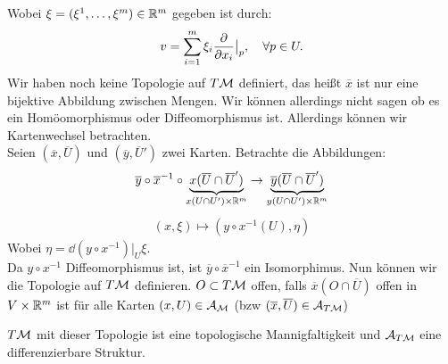 Wobei $\xi = (\xi^1, \dots, \xi^m) \in \mathbb{R}^m$ gegeben ist durch:
\begin{align}
v = \sum_{i=1}^{m} \xi_i \pdv{x_i} \big\vert_p, \quad \forall p \in U.
\end{align}
Wir haben noch keine Topologie auf $T\mathcal{M}$ definiert, das heißt $\overline{x}$ ist nur eine bijektive Abbildung zwischen Mengen.
Wir können allerdings nicht sagen ob es ein Homöomorphismus oder Diffeomorphismus ist.
Allerdings können wir Kartenwechsel betrachten.\\
Seien $(\overline{x}, \overline{U})$ und $(\overline{y}, \overline{U}')$ zwei Karten. 
Betrachte die Abbildungen:
\begin{align}
\overline{y} \circ \overline{x}^{-1} \circ \underbrace{x (\overline{U} \cap \overline{U}')}_{x(U \cap U') \times \mathbb{R}^m} \to \underbrace{\overline{y}(\overline{U} \cap \overline{U}')}_{y(U \cap U') \times \mathbb{R}^m}
\end{align}
\begin{align}
(x,\xi) \mapsto (y\circ x^{-1}(U), \eta) 
\end{align}
Wobei $\eta = \dd (y \circ x^{-1})\big\vert_U \xi$.\\
Da $y\circ x^{-1}$ Diffeomorphismus ist, ist $\overline{y} \circ \overline{x}^{-1}$ ein Isomorphimus.
Nun können wir die Topologie auf $T\mathcal{M}$ definieren.
$O \subset T\mathcal{M}$ offen, falls $\overline{x}(O\cap \overline{U})$ offen in $V \times \mathbb{R}^m$ ist für alle Karten $(x, U) \in \mathcal{A}_{\mathcal{M}}$ (bzw $(\overline{x}, \overline{U}) \in \mathcal{A}_{T\mathcal{M}}$)
\begin{satz}
$T\mathcal{M}$ mit dieser Topologie ist eine topologische Mannigfaltigkeit und $\mathcal{A}_{T\mathcal{M}}$ eine differenzierbare Struktur.
\end{satz}
